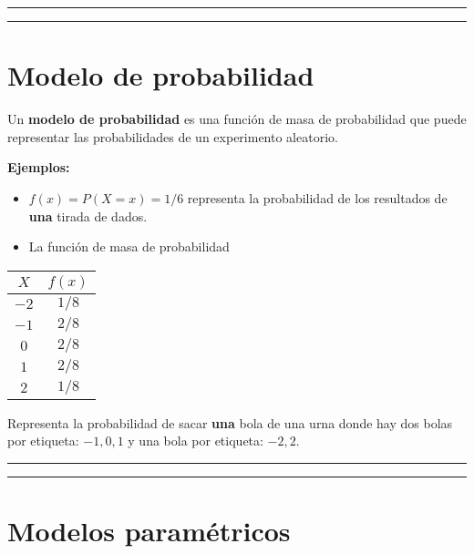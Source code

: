 \documentclass[
]{book}
\begin{document}
\begin{center}\rule{0.5\linewidth}{0.5pt}\end{center}

\begin{center}\rule{0.5\linewidth}{0.5pt}\end{center}

\hypertarget{modelo-de-probabilidad}{%
\section{Modelo de probabilidad}\label{modelo-de-probabilidad}}

Un \textbf{modelo de probabilidad} es una función de masa de probabilidad que puede representar las probabilidades de un experimento aleatorio.

\textbf{Ejemplos:}

\begin{itemize}
\item
  \(f(x)=P(X=x)=1/6\) representa la probabilidad de los resultados de \textbf{una} tirada de dados.
\item
  La función de masa de probabilidad
\end{itemize}

\begin{longtable}[]{@{}cc@{}}
\toprule
\(X\) & \(f(x)\) \\
\midrule
\endhead
\(-2\) & \(1/8\) \\
\(-1\) & \(2/8\) \\
\(0\) & \(2/8\) \\
\(1\) & \(2/8\) \\
\(2\) & \(1/8\) \\
\bottomrule
\end{longtable}

Representa la probabilidad de sacar \textbf{una} bola de una urna donde hay dos bolas por etiqueta: \(-1, 0, 1\) y una bola por etiqueta: \(-2, 2\).

\begin{center}\rule{0.5\linewidth}{0.5pt}\end{center}

\begin{center}\rule{0.5\linewidth}{0.5pt}\end{center}

\hypertarget{modelos-paramuxe9tricos}{%
\section{Modelos paramétricos}\label{modelos-paramuxe9tricos}}
\end{document}
